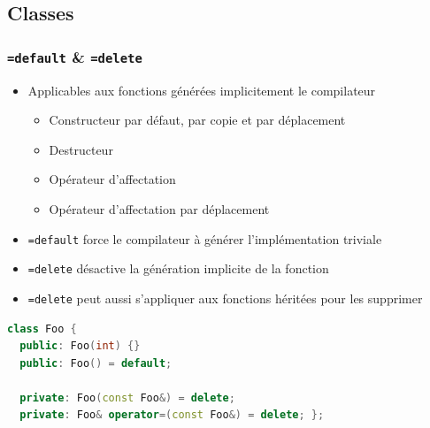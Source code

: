 \documentclass[C++.tex]{subfiles}
\begin{document}
\subsection*{Classes}
\begin{frame}[fragile]
	\frametitle{\lstinline|=default| \& \lstinline|=delete|}
	\begin{itemize}
		\item Applicables aux fonctions générées implicitement le compilateur
		\begin{itemize}
			\item Constructeur par défaut, par copie et par déplacement
			\item Destructeur
			\item Opérateur d'affectation
			\item Opérateur d'affectation par déplacement
		\end{itemize}
		\item \lstinline|=default| force le compilateur à générer l'implémentation \og triviale\fg{}
		\item \lstinline|=delete| désactive la génération implicite de la fonction
		\item \lstinline|=delete| peut aussi s'appliquer aux fonctions héritées pour les supprimer
	\end{itemize}


	\begin{lstlisting}[language=C++]
class Foo {
  public: Foo(int) {}
  public: Foo() = default;

  private: Foo(const Foo&) = delete;
  private: Foo& operator=(const Foo&) = delete; };\end{lstlisting}
\end{frame}
\end{document}
